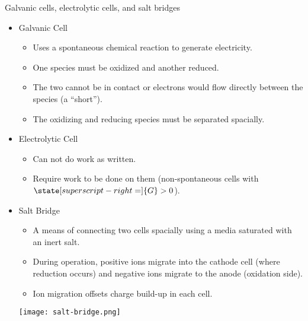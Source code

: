\documentclass[notes=show]{beamer}
\begin{document}
\clearpage

\begin{frame}[allowframebreaks]{Galvanic cells, electrolytic cells, and salt
	bridges}
	\begin{itemize}
		\item Galvanic Cell
			\begin{itemize}
				\item Uses a spontaneous chemical reaction to
					generate electricity.
				\item \alert{One} species must be oxidized and
					\alert{another} reduced.
				\item The two cannot be in contact or electrons
					would flow directly between the species
					(a ``short'').
				\item The oxidizing and reducing species must be
					separated spacially.
			\end{itemize}
		\item Electrolytic Cell
			\begin{itemize}
				\item Can not do work as written.
				\item Require work to be done on them
					(non-spontaneous cells with
					$\state[superscript-right=]{G} > 0$).
			\end{itemize}

			\framebreak

		\item Salt Bridge
			\begin{itemize}
				\item A means of connecting two cells spacially
					using a media saturated with an inert
					salt.
				\item During operation, positive ions migrate
					into the \alert{cathode} cell (where
					reduction occurs) and negative ions
					migrate to the \alert{anode} (oxidation
					side).
				\item Ion migration offsets charge build-up in
					each cell.
			\end{itemize}
			\begin{center}
				\texttt{[image: salt-bridge.png]}
			\end{center}
	\end{itemize}
\end{frame}

\end{document}
